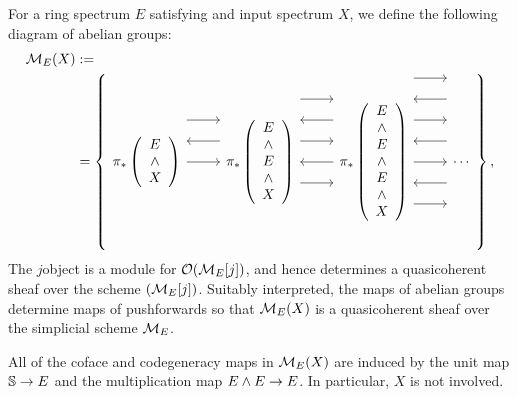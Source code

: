 \begin{definition}\label{DefnHomologyFunctorsValuedInSheaves}
For a ring spectrum $E$ satisfying {\CH} and input spectrum $X$, we define the following diagram of abelian groups:
\begin{align*}
\context{E}(X) & := \\
& = \left\{
\begin{tikzcd}[ampersand replacement=\&]
\pi_* \left( \begin{array}{c} E \\ \sm \\ X \end{array} \right) \arrow[leftarrow, shift left=\baselineskip]{r} \arrow[shift left=(2*\baselineskip)]{r} \arrow{r} \&
\pi_* \left( \begin{array}{c} E \\ \sm \\ E \\ \sm \\ X \end{array} \right) \arrow[shift left=(3*\baselineskip)]{r} \arrow[leftarrow, shift left=(2*\baselineskip)]{r} \arrow[shift left=\baselineskip]{r} \arrow[leftarrow]{r} \arrow[shift right=\baselineskip]{r} \&
\pi_* \left( \begin{array}{c} E \\ \sm \\ E \\ \sm \\ E \\ \sm \\ X \end{array} \right) \arrow[shift left=(4*\baselineskip)]{r} \arrow[leftarrow, shift left=(3*\baselineskip)]{r} \arrow[shift left=(2*\baselineskip)]{r} \arrow[leftarrow, shift left=\baselineskip]{r} \arrow{r} \arrow[leftarrow, shift right=\baselineskip]{r} \arrow[shift right=(2*\baselineskip)]{r} \&
\cdots
\end{tikzcd}
\right\},
\end{align*}
The $j$\th object is a module for $\sheaf{O}(\context{E}[j])$, and hence determines a quasicoherent sheaf over the scheme $(\context{E}[j])$.  Suitably interpreted, the maps of abelian groups determine maps of pushforwards so that $\context{E}(X)$ is a quasicoherent sheaf over the simplicial scheme $\context{E}$.
\end{definition}

\begin{remark}
All of the coface and codegeneracy maps in $\context{E}(X)$ are induced by the unit map $\S \to E$ and the multiplication map $E \sm E \to E$.  In particular, $X$ is not involved.
\end{remark}


